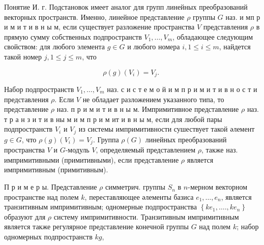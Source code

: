 \documentclass[10pt]{article}
\begin{document}
Понятие И. г. Подстановок имеет аналог для групп линейных преобразований векторных пространств. Именно, линейное представление $\rho$ группы $G$ наз. и мп р и м и т и в н ы м, если существует разложение пространства $V$ представления $\rho$ в прямую сумму собственных подпространств $V_{1}, \ldots, V_{m}$, обладающее следующим свойством: для любого элемента $g \in G$ и любого номера $i, 1 \leqslant i \leqslant m$, найдется такой номер $j, 1 \leqslant j \leqslant m$, что



\[

\rho(g)\left(V_{i}\right)=V_{j} \text {. }

\]



Набор подпространств $V_{1}, \ldots, V_{m}$ наз. с и с т е м о й и м п р и м и т и в н о с т и представления $\rho$. Если $V$ не обладает разложением указанного типа, то представление $\rho$ наз. п р и м и т и в н ы м. Импримитивное представление $\rho$ наз. т р а н з и т и в ны м и м п р и м ит и в н ы м, если для любой пары подпространств $V_{i}$ и $V_{j}$ из системы импримитивности сушествует такой әлемент $g \in G$, что $\rho(g)\left(V_{i}\right)=V_{j}$. Группа $\rho(G)$ линейных преобразований пространства $V$ и $G$-модуль $V$, определяемый представлением $\rho$, также наз. импримитивными (примитивными), если представление $\rho$ является импримитивным (примитивным).



П р и м е р ы. Представление $\rho$ симметрич. группы $S_{n}$ в $n$-мерном векторном пространстве над полем $k$, переставляющее әлементы базиса $e_{1}, \ldots, e_{n}$, является транзитивным импримитивным; одномерные подпространства $\left\{k e_{1}, \ldots ., k e_{n}\right\}$ образуют для $\rho$ систему импримитивности. Транзитивным импримитивным является также регулярное представление конечной группы $G$ над полем $k$; набор одномерных подпространств $k g$,
\end{document}
